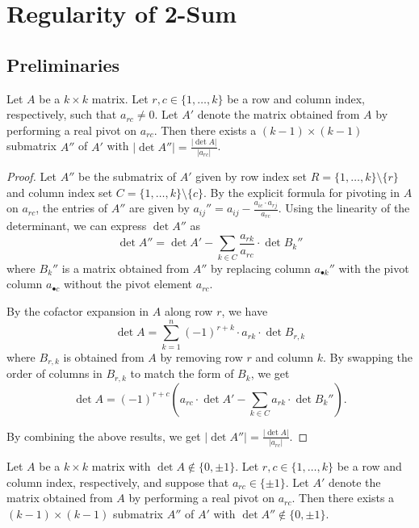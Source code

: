 \section{Regularity of 2-Sum}

\subsection{Preliminaries}

\begin{lemma}\label{lem:pivot_submatrix_det}
    Let $A$ be a $k \times k$ matrix. Let $r, c \in \{1, \dots, k\}$ be a row and column index, respectively, such that $a_{rc} \neq 0$. Let $A'$ denote the matrix obtained from $A$ by performing a real pivot on $a_{rc}$. Then there exists a $(k - 1) \times (k - 1)$ submatrix $A''$ of $A'$ with $|\det A''| = \frac{|\det A|}{|a_{rc}|}$.
\end{lemma}

\begin{proof}
    Let $A''$ be the submatrix of $A'$ given by row index set $R = \{1, \dots, k\} \setminus \{r\}$ and column index set $C = \{1, \dots, k\} \setminus \{c\}$. By the explicit formula for pivoting in $A$ on $a_{rc}$, the entries of $A''$ are given by $a_{ij}'' = a_{ij} - \frac{a_{ic} \cdot a_{rj}}{a_{rc}}$. Using the linearity of the determinant, we can express $\det A''$ as
    \[
        \det A'' = \det A' - \sum_{k \in C} \frac{a_{rk}}{a_{rc}} \cdot \det B_{k}''
    \]
    where $B_{k}''$ is a matrix obtained from $A''$ by replacing column $a_{\bullet k}''$ with the pivot column $a_{\bullet c}$ without the pivot element $a_{rc}$.

    By the cofactor expansion in $A$ along row $r$, we have
    \[
        \det A = \sum_{k = 1}^{n} (-1)^{r + k} \cdot a_{rk} \cdot \det B_{r, k}
    \]
    where $B_{r, k}$ is obtained from $A$ by removing row $r$ and column $k$. By swapping the order of columns in $B_{r, k}$ to match the form of $B_{k}$, we get
    \[
        \det A = (-1)^{r + c} (a_{rc} \cdot \det A' - \sum_{k \in C} a_{rk} \cdot \det B_{k}'').
    \]

    By combining the above results, we get $|\det A''| = \frac{|\det A|}{|a_{rc}|}$.
\end{proof}

\begin{corollary}\label{cor:pivot_submatrix_det}
    Let $A$ be a $k \times k$ matrix with $\det A \notin \{0, \pm 1\}$. Let $r, c \in \{1, \dots, k\}$ be a row and column index, respectively, and suppose that $a_{rc} \in \{\pm 1\}$. Let $A'$ denote the matrix obtained from $A$ by performing a real pivot on $a_{rc}$. Then there exists a $(k - 1) \times (k - 1)$ submatrix $A''$ of $A'$ with $\det A'' \notin \{0, \pm 1\}$.
\end{corollary}

